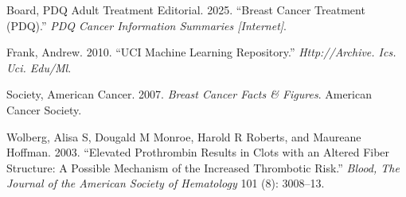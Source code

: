 \documentclass[
  letterpaper,
  DIV=11,
  numbers=noendperiod]{scrartcl}
\newlength{\cslhangindent}
\newenvironment{CSLReferences}[2] %
 {\begin{list}{}{%
  \setlength{\itemindent}{0pt}
  \setlength{\leftmargin}{0pt}
  \setlength{\parsep}{0pt}
  \ifodd #1
   \setlength{\leftmargin}{\cslhangindent}
   \setlength{\itemindent}{-1\cslhangindent}
  \fi
  \setlength{\itemsep}{#2\baselineskip}}}
 {\end{list}}
\begin{document}
\label{refs}
\begin{CSLReferences}{1}{0}
Board, PDQ Adult Treatment Editorial. 2025. {``Breast Cancer Treatment
(PDQ{\textregistered}).''} \emph{PDQ Cancer Information Summaries
{[}Internet{]}}.

Frank, Andrew. 2010. {``UCI Machine Learning Repository.''}
\emph{Http://Archive. Ics. Uci. Edu/Ml}.

Society, American Cancer. 2007. \emph{Breast Cancer Facts \& Figures}.
American Cancer Society.

Wolberg, Alisa S, Dougald M Monroe, Harold R Roberts, and Maureane
Hoffman. 2003. {``Elevated Prothrombin Results in Clots with an Altered
Fiber Structure: A Possible Mechanism of the Increased Thrombotic
Risk.''} \emph{Blood, The Journal of the American Society of Hematology}
101 (8): 3008--13.

\end{CSLReferences}
\end{document}
